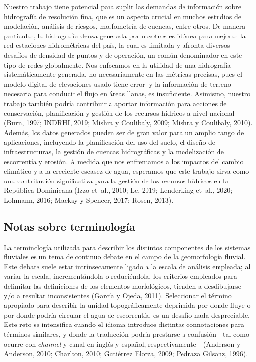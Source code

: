 \documentclass[spanish]{article}
\begin{document}
Nuestro trabajo tiene potencial para suplir las demandas de información
sobre hidrografía de resolución fina, que es un aspecto crucial en
muchos estudios de modelación, análisis de riesgos, morfometría de
cuencas, entre otros. De manera particular, la hidrografía densa
generada por nosotros es idónea para mejorar la red estaciones
hidrométricas del país, la cual es limitada y afronta diversos desafíos
de densidad de puntos y de operación, un común denominador en este tipo
de redes globalmente. Nos enfocamos en la utilidad de una hidrografía
sistemáticamente generada, no necesariamente en las métricas precisas,
pues el modelo digital de elevaciones usado tiene error, y la
información de terreno necesaria para conducir el flujo en áreas llanas,
es insuficiente. Asimismo, nuestro trabajo también podría contribuir a
aportar información para acciones de conservación, planificación y
gestión de los recursos hídricos a nivel nacional (Burn, 1997; INDRHI,
2019; Mishra y Coulibaly, 2009; Mishra y Coulibaly, 2010). Además, los
datos generados pueden ser de gran valor para un amplio rango de
aplicaciones, incluyendo la planificación del uso del suelo, el diseño
de infraestructuras, la gestión de cuencas hidrográficas y la
modelización de escorrentía y erosión. A medida que nos enfrentamos a
los impactos del cambio climático y a la creciente escasez de agua,
esperamos que este trabajo sirva como una contribución significativa
para la gestión de los recursos hídricos en la República Dominicana
(Izzo et~al., 2010; Le, 2019; Lenderking et~al., 2020; Lohmann, 2016;
Mackay y Spencer, 2017; Roson, 2013).

\hypertarget{notas-sobre-terminologuxeda}{%
\subsection*{Notas sobre
terminología}\label{notas-sobre-terminologuxeda}}

La terminología utilizada para describir los distintos componentes de
los sistemas fluviales es un tema de continuo debate en el campo de la
geomorfología fluvial. Este debate suele estar intrínsecamente ligado a
la escala de análisis empleada; al variar la escala, incrementándola o
reduciéndola, los criterios empleados para delimitar las definiciones de
los elementos morfológicos, tienden a desdibujarse y/o a resultar
inconsistentes (García y Ojeda, 2011). Seleccionar el término apropiado
para describir la unidad topográficamente deprimida por donde fluye o
por donde podría circular el agua de escorrentía, es un desafío nada
despreciable. Este reto se intensifica cuando el idioma introduce
distintas connotaciones para términos similares, y donde la traducción
podría prestarse a confusión---tal como ocurre con \emph{channel} y
canal en inglés y español, respectivamente---(Anderson y Anderson, 2010;
Charlton, 2010; Gutiérrez Elorza, 2009; Pedraza Gilsanz, 1996).
\end{document}
